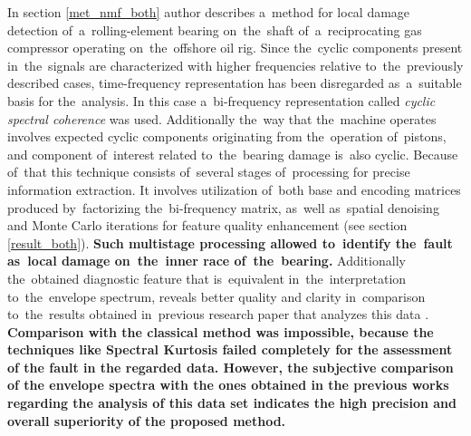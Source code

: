 In section \ref{met_nmf_both} author describes a~method for local damage detection of~a~rolling-element bearing on~the~shaft of~a~reciprocating gas compressor operating on~the~offshore oil rig. Since the~cyclic components present in~the~signals are characterized with higher frequencies relative to~the~previously described cases, time-frequency representation has been disregarded as~a~suitable basis for the~analysis. In this case a~bi-frequency representation called \emph{cyclic spectral coherence} was used. Additionally the~way that the~machine operates involves expected cyclic components originating from the~operation of~pistons, and component of~interest related to~the~bearing damage is~also cyclic. Because of~that this technique consists of~several stages of~processing for precise information extraction. It involves utilization of~both base and encoding matrices produced by~factorizing the~bi-frequency matrix, as~well as~spatial denoising and Monte Carlo iterations for feature quality enhancement (see section \ref{result_both}). \textbf{Such multistage processing allowed to~identify the~fault as~local damage on~the~inner race of~the~bearing.} Additionally the~obtained diagnostic feature that is~equivalent in~the~interpretation to~the~envelope spectrum, reveals better quality and clarity in~comparison to~the~results obtained in~previous research paper that analyzes this data \cite{barszcz2013bearings}. \textbf{Comparison with the classical method was impossible, because the techniques like Spectral Kurtosis failed completely for the assessment of the fault in the regarded data. However, the subjective comparison of the envelope spectra with the ones obtained in the previous works regarding the analysis of this data set indicates the high precision and overall superiority of the proposed method.}

